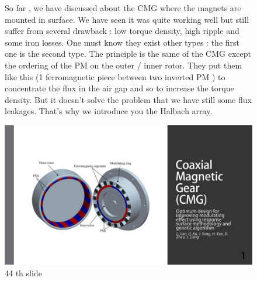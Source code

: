 \begin{figure}[H]
    \begin{minipage}{.45\linewidth}
    So far , we have discussed about the CMG where the magnets are mounted in surface. We have seen it was quite working well but still suffer from several drawback : low torque density, high ripple and some iron losses.
    One must know they exist other types : the first one is the second type. The principle is the same of the CMG except the ordering of the PM on the outer / inner rotor. They put them like this (1 ferromagnetic piece between two inverted PM ) to concentrate the flux in the air gap and so to increase the torque density. But it  doesn't solve the problem that we have still some flux leakages. That's why we introduce you the Halbach array.
       
    \end{minipage}
    \hfill%
    \begin{minipage}[c]{.45\linewidth}
        \centering
        \includegraphics[page={44},width=\textwidth]{LELEC2311.allow.pdf}
        \caption{44 th slide}
    \end{minipage}
\end{figure}

